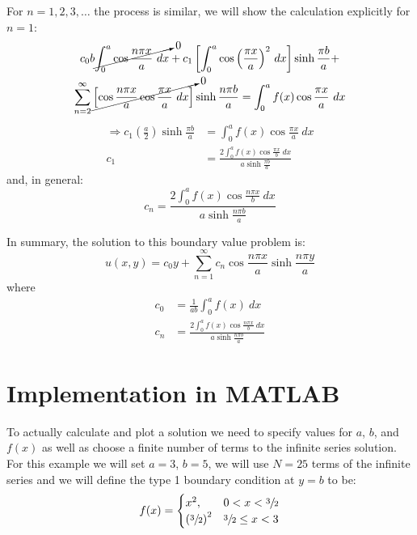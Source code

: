 \vspace{0.25cm}

\noindent For $n=1,2,3,\dots$ the process is similar, we will show the calculation explicitly for $n=1$:
\begin{multline*}
c_0b\cancelto{0}{\int_{0}^{a} \cos{\frac{n \pi x}{a}} \ dx} + c_1\left[\int_0^a \cos{\left(\frac{\pi x}{a}\right)}^2 \ dx \right]\sinh{\frac{\pi b}{a}} + \\ \sum\limits_{n=2}^{\infty} \cancelto{0}{\left[\cos{\frac{n \pi x}{a}}\cos{\frac{ \pi x}{a}} \ dx \right]}\sinh{\frac{n \pi b}{a}} = \int_0^a f(x) \cos{\frac{\pi x}{a}} \ dx 
\end{multline*}
\begin{align*}
\Rightarrow c_1 \left(\frac{a}{2} \right)\sinh{\frac{\pi b}{a}} &= \int_0^a f(x) \cos{\frac{\pi x}{a}} \ dx \\
c_1 &= \frac{2\int_0^a f(x) \cos{\frac{\pi x}{b}} \ dx}{a \sinh{\frac{\pi b}{a}}}
\end{align*}
and, in general:
\begin{equation*}
c_n = \frac{2\int_0^a f(x) \cos{\frac{n \pi x}{b}} \ dx}{a \sinh{\frac{n \pi b}{a}}}
\end{equation*}

\vspace{0.25cm}

\noindent In summary, the solution to this boundary value problem is:
\begin{equation*}
u(x,y) = c_0y + \sum\limits_{n=1}^{\infty} c_n \cos{\frac{n \pi x}{a}} \sinh{\frac{n \pi y}{a}}
\end{equation*}
where
\begin{align*}
c_0 &= \frac{1}{ab}\int_0^a f(x) \ dx \\
c_n &= \frac{2\int_0^a f(x) \cos{\frac{n \pi x}{b}} \ dx}{a \sinh{\frac{n \pi b}{a}}}
\end{align*}

\section{Implementation in MATLAB}

To actually calculate and plot a solution we need to specify values for $a$, $b$, and $f(x)$ as well as choose a finite number of terms to the infinite series solution.  For this example we will set $a=3$, $b=5$, we will use $N=25$ terms of the infinite series and we will define the type 1 boundary condition at $y=b$ to be:
\begin{equation*}
f(x) = 
\begin{cases}
x^2, & 0 < x < \sfrac{3}{2} \\
\left(\sfrac{3}{2} \right)^2 & \sfrac{3}{2} \le x < 3
\end{cases}
\end{equation*}

